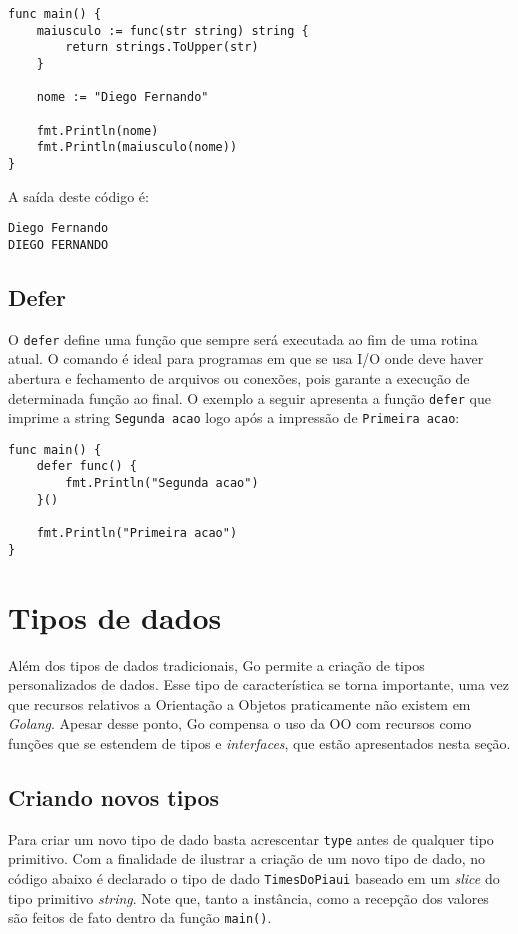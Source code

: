 \documentclass{SBCbookchapter}
\begin{document}
\begin{lstlisting}
func main() {
	maiusculo := func(str string) string {
		return strings.ToUpper(str)
	}
	
	nome := "Diego Fernando"
	
	fmt.Println(nome)
	fmt.Println(maiusculo(nome))
}
\end{lstlisting}

A saída deste código é:

\noindent\texttt{Diego Fernando}\\
\texttt{DIEGO FERNANDO}\\

\subsection{Defer}

O \texttt{defer} define uma função que sempre será executada ao fim de uma rotina atual. O comando é ideal para programas em que se usa I/O onde deve haver abertura e fechamento de arquivos ou conexões, pois garante a execução de determinada função ao final. O exemplo a seguir apresenta a função \texttt{defer} que imprime a string \texttt{Segunda acao} logo após a impressão de \texttt{Primeira acao}:

\begin{lstlisting}
func main() {
	defer func() {
		fmt.Println("Segunda acao")
	}()
	
	fmt.Println("Primeira acao")
}
\end{lstlisting}

\section{Tipos de dados}
	
Além dos tipos de dados tradicionais, Go permite a criação de tipos personalizados de dados. Esse tipo de característica se torna importante, uma vez que recursos relativos a Orientação a Objetos praticamente não existem em \textit{Golang}. Apesar desse ponto, Go compensa o uso da OO com recursos como funções que se estendem de tipos e \textit{interfaces}, que estão apresentados nesta seção.
	
\subsection{Criando novos tipos}
	
Para criar um novo tipo de dado basta acrescentar \texttt{type} antes de qualquer tipo primitivo. Com a finalidade de ilustrar a criação de um novo tipo de dado, no código abaixo é declarado o tipo de dado \texttt{TimesDoPiaui} baseado em um \textit{slice} do tipo primitivo \textit{string}. Note que, tanto a instância, como a recepção dos valores são feitos de fato dentro da função \texttt{main()}.
	
\end{document}
